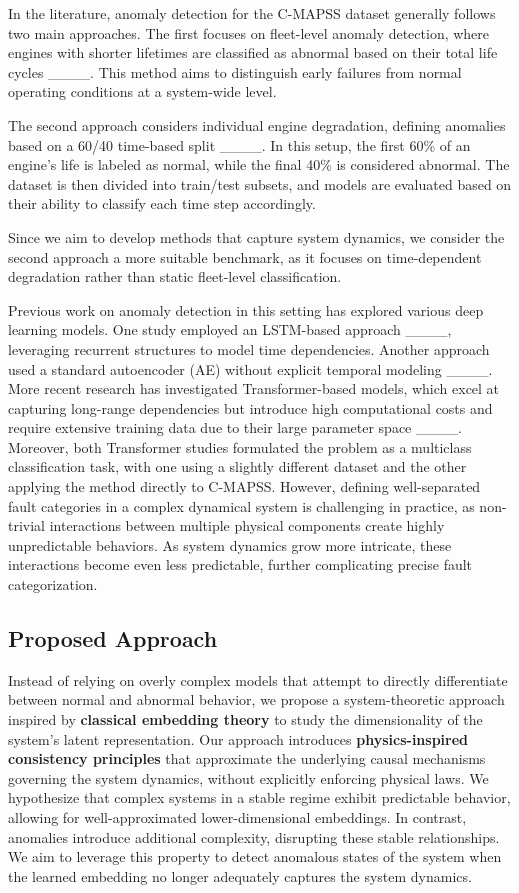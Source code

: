 In the literature, anomaly detection for the C-MAPSS dataset generally follows two main approaches. The first focuses on fleet-level anomaly detection, where engines with shorter lifetimes are classified as abnormal based on their total life cycles ____. This method aims to distinguish early failures from normal operating conditions at a system-wide level.

The second approach considers individual engine degradation, defining anomalies based on a 60/40 time-based split ____. In this setup, the first 60\% of an engine’s life is labeled as normal, while the final 40\% is considered abnormal. The dataset is then divided into train/test subsets, and models are evaluated based on their ability to classify each time step accordingly.

Since we aim to develop methods that capture system dynamics, we consider the second approach a more suitable benchmark, as it focuses on time-dependent degradation rather than static fleet-level classification.

Previous work on anomaly detection in this setting has explored various deep learning models. One study employed an LSTM-based approach ____, leveraging recurrent structures to model time dependencies. Another approach used a standard autoencoder (AE) without explicit temporal modeling ____. More recent research has investigated Transformer-based models, which excel at capturing long-range dependencies but introduce high computational costs and require extensive training data due to their large parameter space ____. Moreover, both Transformer studies formulated the problem as a multiclass classification task, with one using a slightly different dataset and the other applying the method directly to C-MAPSS. However, defining well-separated fault categories in a complex dynamical system is challenging in practice, as non-trivial interactions between multiple physical components create highly unpredictable behaviors. As system dynamics grow more intricate, these interactions become even less predictable, further complicating precise fault categorization.
\subsection{Proposed Approach}

Instead of relying on overly complex models that attempt to directly differentiate between normal and abnormal behavior, we propose a system-theoretic approach inspired by \textbf{classical embedding theory} to study the dimensionality of the system's latent representation. Our approach introduces \textbf{physics-inspired consistency principles} that approximate the underlying causal mechanisms governing the system dynamics, without explicitly enforcing physical laws. We hypothesize that complex systems in a stable regime exhibit predictable behavior, allowing for well-approximated lower-dimensional embeddings. In contrast, anomalies introduce additional complexity, disrupting these stable relationships. We aim to leverage this property to detect anomalous states of the system when the learned embedding no longer adequately captures the system dynamics.
